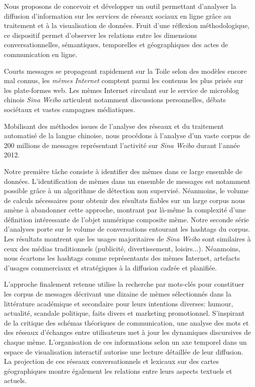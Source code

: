 
Nous proposons de concevoir et développer un outil permettant d’analyser la diffusion d’information sur les services de réseaux sociaux en ligne grâce au traitement et à la visualisation de données. Fruit d’une réflexion méthodologique, ce dispositif permet d’observer les relations entre les dimensions conversationnelles, sémantiques, temporelles et géographiques des actes de communication en ligne.

Courts messages se propageant rapidement sur la Toile selon des modèles encore mal connus, les \textit{mèmes Internet} comptent parmi les contenus les plus prisés sur les plate-formes web. Les mèmes Internet circulant sur le service de microblog chinois \textit{Sina Weibo} articulent notamment discussions personnelles, débats sociétaux et vastes campagnes médiatiques.

Mobilisant des méthodes issues de l’analyse des réseaux et du traitement automatisé de la langue chinoise, nous procédons à l’analyse d’un vaste corpus de 200 millions de messages représentant l’activité sur \textit{Sina Weibo} durant l’année 2012. 

Notre première tâche consiste à identifier des mèmes dans ce large ensemble de données. L’identification de mèmes dans un ensemble de messages est notamment possible grâce à un algorithme de détection non supervisé. Néanmoins, le volume de calculs nécessaires pour obtenir des résultats fiables sur un large corpus nous amène à abandonner cette approche, montrant par là-même la complexité d’une définition intéressante de l’objet numérique composite mème. Notre seconde série d’analyses porte sur le volume de conversations entourant les hashtags du corpus. Les résultats montrent que les usages majoritaires de \textit{Sina Weibo} sont similaires à ceux des médias traditionnels (publicité, divertissement, loisirs...). Néanmoins, nous écartons les hashtags comme représentants des mèmes Internet, artefacts d’usages commerciaux et stratégiques à la diffusion cadrée et planifiée. 

L’approche finalement retenue utilise la recherche par mots-clés pour constituer les corpus de messages décrivant une dizaine de mèmes sélectionnés dans la littérature académique et secondaire pour leurs intentions diverses: humour, actualité, scandale politique, faits divers et marketing promotionnel. S’inspirant de la critique des schémas théoriques de communication, une analyse des mots et des réseaux d’échanges entre utilisateurs met à jour les dynamiques discursives de chaque mème. L’organisation de ces informations selon un axe temporel dans un espace de visualisation interactif autorise une lecture détaillée de leur diffusion. La projection de ces réseaux conversationnels et lexicaux sur des cartes géographiques montre également les relations entre leurs aspects textuels et actuels.

